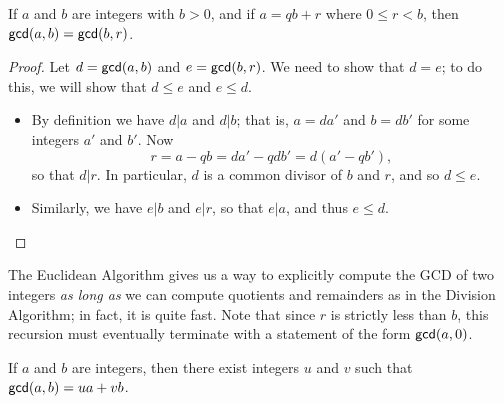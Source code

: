 \begin{prop}
If \(a\) and \(b\) are integers with \(b > 0\), and if \(a = qb + r\) where \(0 \leq r < b\), then \(\mathsf{gcd}(a, b) = \mathsf{gcd}(b, r)\).
\end{prop}

\begin{proof}
Let \(d = \mathsf{gcd}(a, b)\) and \(e = \mathsf{gcd}(b, r)\).
We need to show that \(d = e\); to do this, we will show that \(d \leq e\) and \(e \leq d\).
\begin{itemize}
\item By definition we have \(d|a\) and \(d|b\); that is, \(a = da'\) and \(b = db'\) for some integers \(a'\) and \(b'\).
Now \[ r = a - qb = da' - qdb' = d(a' - qb'), \] so that \(d|r\).
In particular, \(d\) is a common divisor of \(b\) and \(r\), and so \(d \leq e\).
\item Similarly, we have \(e|b\) and \(e|r\), so that \(e|a\), and thus \(e \leq d\).
\end{itemize}
\end{proof}

The Euclidean Algorithm gives us a way to explicitly compute the GCD of two integers \emph{as long as} we can compute quotients and remainders as in the Division Algorithm; in fact, it is quite fast.
Note that since \(r\) is strictly less than \(b\), this recursion must eventually terminate with a statement of the form \(\mathsf{gcd}(a, 0)\).


\begin{thm}
If \(a\) and \(b\) are integers, then there exist integers \(u\) and \(v\) such that \(\mathsf{gcd}(a, b) = ua + vb\).
\end{thm}

